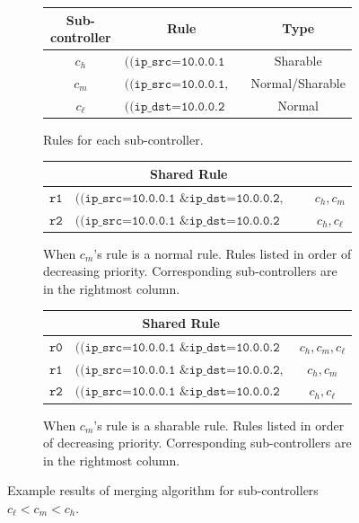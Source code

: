 \documentclass{article}
\begin{document}
\begin{figure}
\centering
\begin{subfigure}{1.0\textwidth}
\begin{center}
\begin{tabular}{|c|c|c|}
\hline
Sub-controller & Rule & Type \\
\hline
$c_h$ & $\texttt{((ip\_src=10.0.0.1 \& ip\_dst=10.0.0.2, s1), ah)}$ & Sharable \\
\hline
$c_m$ & $\texttt{((ip\_src=10.0.0.1, s1), am)}$ & Normal/Sharable \\
\hline
$c_{\ell}$ & $\texttt{((ip\_dst=10.0.0.2 \& in\_port=0, s1), al)}$ & Normal \\
\hline
\end{tabular}
\end{center}
\caption{Rules for each sub-controller.}
\label{table_algo_a}
\end{subfigure}
\par\bigskip
\begin{subfigure}{1.0\textwidth}
\begin{center}
\begin{tabular}{|c|c|c|}
\hline
& Shared Rule &  \\
\hline
$\texttt{r1}$ & $\texttt{((ip\_src=10.0.0.1 \& ip\_dst=10.0.0.2, s1), ah + am)}$
& $c_h, c_m$ \\
\hline
$\texttt{r2}$ & $\texttt{((ip\_src=10.0.0.1 \& ip\_dst=10.0.0.2 \& in\_port=0, s1), ah + al)}$
& $c_h, c_{\ell}$ \\
\hline
\end{tabular}
\end{center}
\caption{When $c_m$'s rule is a normal rule. 
Rules listed in order of decreasing priority. 
Corresponding sub-controllers are in the rightmost column.}
\label{table_algo_b}
\end{subfigure}
\par\bigskip
\begin{subfigure}{1.0\textwidth}
\begin{center}
\begin{tabular}{|c|c|c|}
\hline
& Shared Rule & \\
\hline
$\texttt{r0}$ & $\texttt{((ip\_src=10.0.0.1 \& ip\_dst=10.0.0.2 \& in\_port=0, s1), ah + am + al)}$
& $c_h, c_m, c_{\ell}$ \\
\hline
$\texttt{r1}$ & $\texttt{((ip\_src=10.0.0.1 \& ip\_dst=10.0.0.2, s1), ah + am)}$
& $c_h, c_m$ \\
\hline
$\texttt{r2}$ & $\texttt{((ip\_src=10.0.0.1 \& ip\_dst=10.0.0.2 \& in\_port=0, s1), ah + al)}$
& $c_h, c_{\ell}$ \\
\hline
\end{tabular}
\end{center}
\caption{When $c_m$'s rule is a sharable rule.
Rules listed in order of decreasing priority. 
Corresponding sub-controllers are in the rightmost column.}
\label{table_algo_c}
\end{subfigure}
\caption{Example results of merging algorithm for sub-controllers $c_{\ell} < c_m < c_h$.}
\label{table_algo}
\end{figure}
\end{document}
